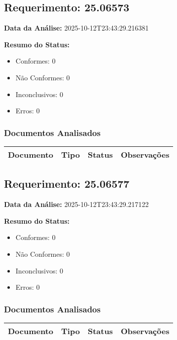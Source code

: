 \documentclass[12pt,a4paper]{article}
\begin{document}
\subsection{Requerimento: 25.06573}

\textbf{Data da Análise:} 2025-10-12T23:43:29.216381

\textbf{Resumo do Status:}
\begin{itemize}
    \item Conformes: 0
    \item Não Conformes: 0
    \item Inconclusivos: 0
    \item Erros: 0
\end{itemize}

\subsubsection{Documentos Analisados}

\begin{longtable}{|p{4cm}|p{2cm}|p{2cm}|p{6cm}|}
\hline
\textbf{Documento} & \textbf{Tipo} & \textbf{Status} & \textbf{Observações} \\
\hline
\endhead
\end{longtable}


\subsection{Requerimento: 25.06577}

\textbf{Data da Análise:} 2025-10-12T23:43:29.217122

\textbf{Resumo do Status:}
\begin{itemize}
    \item Conformes: 0
    \item Não Conformes: 0
    \item Inconclusivos: 0
    \item Erros: 0
\end{itemize}

\subsubsection{Documentos Analisados}

\begin{longtable}{|p{4cm}|p{2cm}|p{2cm}|p{6cm}|}
\hline
\textbf{Documento} & \textbf{Tipo} & \textbf{Status} & \textbf{Observações} \\
\hline
\endhead
\end{longtable}
\end{document}
